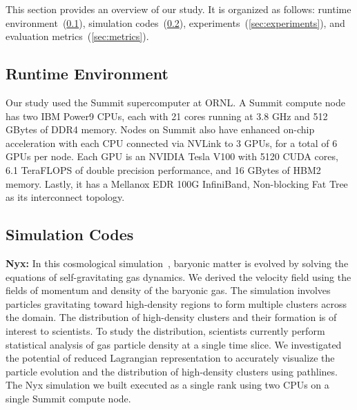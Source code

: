 This section provides an overview of our study. It is organized as follows: runtime environment~(\ref{sec:runtime}), simulation codes~(\ref{sec:simulations}), experiments~(\ref{sec:experiments}), and evaluation metrics~(\ref{sec:metrics}). %

\vspace{-1mm}
\subsection{Runtime Environment}
\label{sec:runtime}
Our study used the Summit supercomputer at ORNL.
%
A Summit compute node has two IBM Power9 CPUs, each with 21 cores running at 3.8 GHz and 512 GBytes of DDR4 memory.
%
Nodes on Summit also have enhanced on-chip acceleration with each CPU connected via NVLink to 3 GPUs, for a total of 6 GPUs per node.
%
Each GPU is an NVIDIA Tesla V100 with 5120 CUDA cores, 6.1 TeraFLOPS of double precision performance, and 16 GBytes of HBM2 memory.
%
Lastly, it has a Mellanox EDR 100G InfiniBand, Non-blocking Fat Tree as its interconnect topology.

\vspace{-1mm}
\subsection{Simulation Codes}
\label{sec:simulations}
%
%

\textbf{Nyx:} In this cosmological simulation~\cite{almgren2013nyx}, baryonic matter is evolved by solving the equations of self-gravitating gas dynamics.
%
We derived the velocity field using the fields of momentum and density of the baryonic gas.
%
The simulation involves particles gravitating toward high-density regions to form multiple clusters across the domain. 
%
The distribution of high-density clusters and their formation is of interest to scientists.
%
To study the distribution, scientists currently perform statistical analysis of gas particle density at a single time slice.
%
We investigated the potential of reduced Lagrangian representation to accurately visualize the particle evolution and the distribution of high-density clusters using pathlines.
%
%
The Nyx simulation we built executed as a single rank using two CPUs on a single Summit compute node.
%

